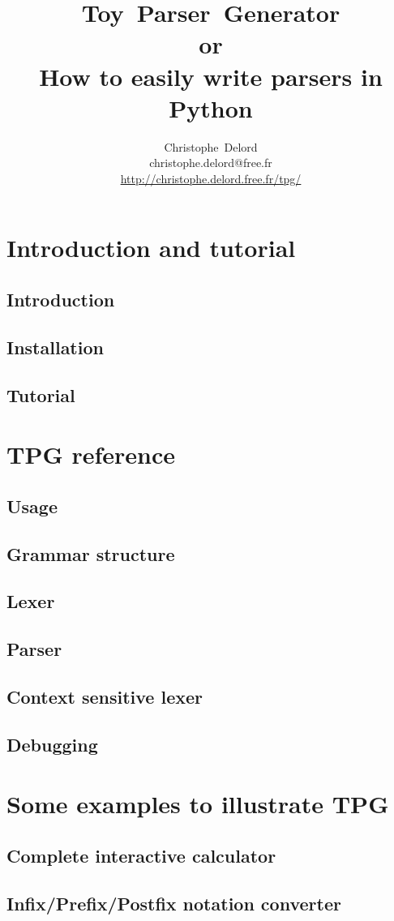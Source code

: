 \documentclass[a4paper,twoside]{report}
\author{
    Christophe~Delord\\
    christophe.delord@free.fr \\
    \url{http://christophe.delord.free.fr/tpg/} \\
}
\title{
    Toy~Parser~Generator \\
    or\\
    How to easily write parsers in Python \\
}
\begin{document}
\maketitle
\tableofcontents

\listoffigures

\cleardoublepage
\part{Introduction and tutorial}                            \label{tpg:intro}
    \chapter{Introduction}
        
    \chapter{Installation}
        
    \chapter{Tutorial}                                      \label{tpg:tutorial}
        

\cleardoublepage
\part{TPG reference}                                        \label{tpg:core}
    \chapter{Usage}
        
    \chapter{Grammar structure}
        
    \chapter{Lexer}
        
    \chapter{Parser}
        
    \chapter{Context sensitive lexer}                       \label{tpg:CSL}
        
    \chapter{Debugging}
        

\cleardoublepage
\part{Some examples to illustrate TPG}                      \label{tpg:examples}
    \chapter{Complete interactive calculator}
        
    \chapter{Infix/Prefix/Postfix notation converter}
        
\end{document}
